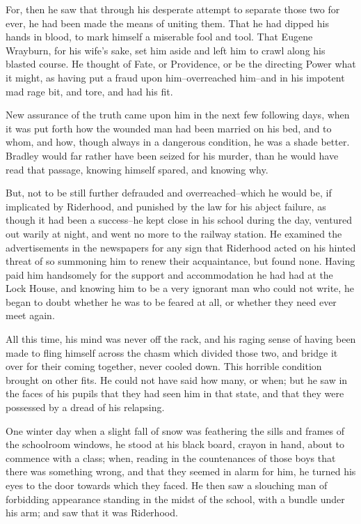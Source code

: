 For, then he saw that through his desperate attempt to separate those
two for ever, he had been made the means of uniting them. That he had
dipped his hands in blood, to mark himself a miserable fool and tool.
That Eugene Wrayburn, for his wife’s sake, set him aside and left him to
crawl along his blasted course. He thought of Fate, or Providence, or
be the directing Power what it might, as having put a fraud upon
him--overreached him--and in his impotent mad rage bit, and tore, and
had his fit.

New assurance of the truth came upon him in the next few following days,
when it was put forth how the wounded man had been married on his bed,
and to whom, and how, though always in a dangerous condition, he was a
shade better. Bradley would far rather have been seized for his murder,
than he would have read that passage, knowing himself spared, and
knowing why.

But, not to be still further defrauded and overreached--which he would
be, if implicated by Riderhood, and punished by the law for his abject
failure, as though it had been a success--he kept close in his school
during the day, ventured out warily at night, and went no more to the
railway station. He examined the advertisements in the newspapers for
any sign that Riderhood acted on his hinted threat of so summoning him
to renew their acquaintance, but found none. Having paid him handsomely
for the support and accommodation he had had at the Lock House, and
knowing him to be a very ignorant man who could not write, he began to
doubt whether he was to be feared at all, or whether they need ever meet
again.

All this time, his mind was never off the rack, and his raging sense of
having been made to fling himself across the chasm which divided those
two, and bridge it over for their coming together, never cooled down.
This horrible condition brought on other fits. He could not have said
how many, or when; but he saw in the faces of his pupils that they had
seen him in that state, and that they were possessed by a dread of his
relapsing.

One winter day when a slight fall of snow was feathering the sills and
frames of the schoolroom windows, he stood at his black board, crayon in
hand, about to commence with a class; when, reading in the countenances
of those boys that there was something wrong, and that they seemed in
alarm for him, he turned his eyes to the door towards which they faced.
He then saw a slouching man of forbidding appearance standing in the
midst of the school, with a bundle under his arm; and saw that it was
Riderhood.

